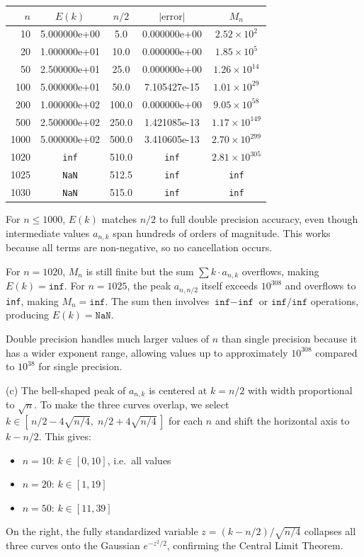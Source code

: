 \documentclass[letterpaper, 11pt]{article}
\newcommand{\1}{\mathds{1}}	%
\theoremstyle{definition}
\begin{document}
\begin{center}
\begin{tabular}{r|cccc}
$n$ & $E(k)$ & $n/2$ & $|\text{error}|$ & $M_n$ \\
\hline
10 & 5.000000e+00 & 5.0 & 0.000000e+00 & $2.52 \times 10^{2}$ \\
20 & 1.000000e+01 & 10.0 & 0.000000e+00 & $1.85 \times 10^{5}$ \\
50 & 2.500000e+01 & 25.0 & 0.000000e+00 & $1.26 \times 10^{14}$ \\
100 & 5.000000e+01 & 50.0 & 7.105427e-15 & $1.01 \times 10^{29}$ \\
200 & 1.000000e+02 & 100.0 & 0.000000e+00 & $9.05 \times 10^{58}$ \\
500 & 2.500000e+02 & 250.0 & 1.421085e-13 & $1.17 \times 10^{149}$ \\
1000 & 5.000000e+02 & 500.0 & 3.410605e-13 & $2.70 \times 10^{299}$ \\
1020 & \texttt{inf} & 510.0 & \texttt{inf} & $2.81 \times 10^{305}$ \\
1025 & \texttt{NaN} & 512.5 & \texttt{inf} & \texttt{inf} \\
1030 & \texttt{NaN} & 515.0 & \texttt{inf} & \texttt{inf}
\end{tabular}
\end{center}

For $n \leq 1000$, $E(k)$ matches $n/2$ to full double precision accuracy, even though intermediate values $a_{n,k}$ span hundreds of orders of magnitude. This works because all terms are non-negative, so no cancellation occurs.

For $n = 1020$, $M_n$ is still finite but the sum $\sum k \cdot a_{n,k}$ overflows, making $E(k) = \texttt{inf}$. For $n = 1025$, the peak $a_{n,n/2}$ itself exceeds $10^{308}$ and overflows to \texttt{inf}, making $M_n = \texttt{inf}$. The sum then involves $\texttt{inf} - \texttt{inf}$ or $\texttt{inf}/\texttt{inf}$ operations, producing $E(k) = \texttt{NaN}$.

Double precision handles much larger values of $n$ than single precision because it has a wider exponent range, allowing values up to approximately $10^{308}$ compared to $10^{38}$ for single precision.

(c) The bell-shaped peak of $a_{n,k}$ is centered at $k = n/2$ with width proportional to $\sqrt{n}$. To make the three curves overlap, we select $k \in [\,n/2 - 4\sqrt{n/4},\; n/2 + 4\sqrt{n/4}\,]$ for each $n$ and shift the horizontal axis to $k - n/2$. This gives:
\begin{itemize}[nosep]
  \item $n = 10$: $k \in [0, 10]$, i.e.\ all values
  \item $n = 20$: $k \in [1, 19]$
  \item $n = 50$: $k \in [11, 39]$
\end{itemize}
On the right, the fully standardized variable $z = (k - n/2)/\sqrt{n/4}$ collapses all three curves onto the Gaussian $e^{-z^2/2}$, confirming the Central Limit Theorem.
\end{document}

